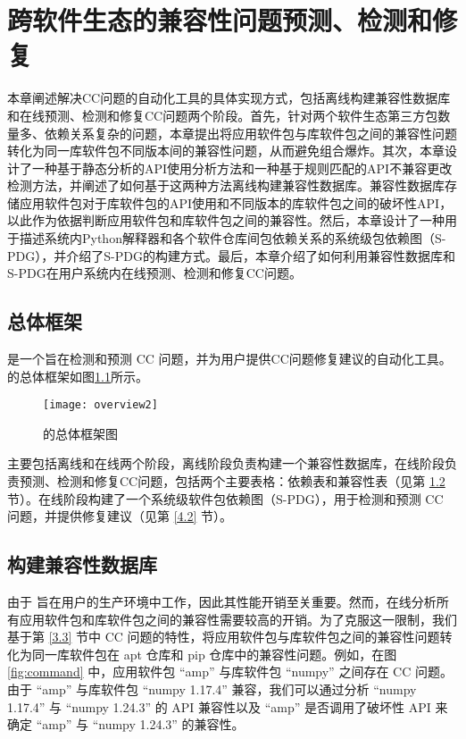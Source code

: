 \chapter{跨软件生态的兼容性问题预测、检测和修复}
本章阐述解决CC问题的自动化工具\tool{}的具体实现方式，包括离线构建兼容性数据库和在线预测、检测和修复CC问题两个阶段。首先，针对两个软件生态第三方包数量多、依赖关系复杂的问题，本章提出将应用软件包与库软件包之间的兼容性问题转化为同一库软件包不同版本间的兼容性问题，从而避免组合爆炸。其次，本章设计了一种基于静态分析的API使用分析方法和一种基于规则匹配的API不兼容更改检测方法，并阐述了如何基于这两种方法离线构建兼容性数据库。兼容性数据库存储应用软件包对于库软件包的API使用和不同版本的库软件包之间的破坏性API，\tool{}以此作为依据判断应用软件包和库软件包之间的兼容性。然后，本章设计了一种用于描述系统内Python解释器和各个软件仓库间包依赖关系的系统级包依赖图（S-PDG），并介绍了S-PDG的构建方式。最后，本章介绍了\tool{}如何利用兼容性数据库和S-PDG在用户系统内在线预测、检测和修复CC问题。

\section{总体框架}
\tool{}是一个旨在检测和预测 CC 问题，并为用户提供CC问题修复建议的自动化工具。\tool{}的总体框架如图\ref{fig:overview}所示。
\begin{figure}[htbp] %
	\centering
	\texttt{[image: overview2]}
	\caption{\tool{}的总体框架图}
	\label{fig:overview}
\end{figure}
\tool{}主要包括离线和在线两个阶段，离线阶段负责构建一个兼容性数据库，在线阶段负责预测、检测和修复CC问题，包括两个主要表格：依赖表和兼容性表（见第 \ref{4.1}节）。在线阶段构建了一个系统级软件包依赖图（S-PDG），用于检测和预测 CC 问题，并提供修复建议（见第 \ref{4.2} 节）。

\section{构建兼容性数据库}\label{4.1}
由于 \tool{} 旨在用户的生产环境中工作，因此其性能开销至关重要。然而，在线分析所有应用软件包和库软件包之间的兼容性需要较高的开销。为了克服这一限制，我们基于第 \ref{3.3} 节中 CC 问题的特性，将应用软件包与库软件包之间的兼容性问题转化为同一库软件包在 apt 仓库和 pip 仓库中的兼容性问题。例如，在图 \ref{fig:command} 中，应用软件包 “amp” 与库软件包 “numpy” 之间存在 CC 问题。由于 “amp” 与库软件包 “numpy 1.17.4” 兼容，我们可以通过分析 “numpy 1.17.4” 与 “numpy 1.24.3” 的 API 兼容性以及 “amp” 是否调用了破坏性 API 来确定 “amp” 与 “numpy 1.24.3” 的兼容性。

